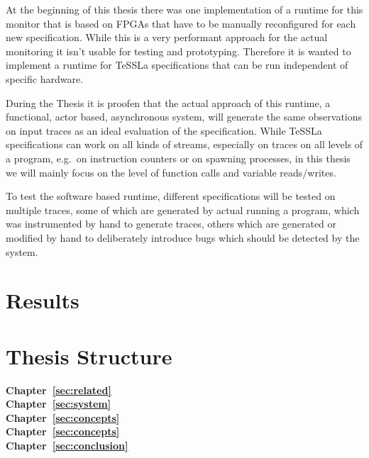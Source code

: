 At the beginning of this thesis there was one implementation of a runtime for this monitor that is based on FPGAs that have to be manually reconfigured for each new specification.
While this is a very performant approach for the actual monitoring it isn't usable for testing and prototyping.
Therefore it is wanted to implement a runtime for TeSSLa specifications that can be run independent of specific hardware.

During the Thesis it is proofen that the actual approach of this runtime, a functional, actor based, asynchronous system,
will generate the same observations on input traces as an ideal evaluation of the specification.
While TeSSLa specifications can work on all kinds of streams, especially on traces on all levels of a program, e.g.\
on instruction counters or on spawning processes, in this thesis we will mainly focus on the level of function calls and variable reads/writes.

To test the software based runtime, different specifications will be tested on multiple traces, some of which are generated by actual running a program,
which was instrumented by hand to generate traces, others which are generated or modified by hand to deliberately introduce bugs which should be detected by the system.

\section{Results}
\label{sec:intro:results}


\section{Thesis Structure}
\label{sec:intro:structure}

\textbf{Chapter~\ref{sec:related}} \\[0.2em]

\textbf{Chapter~\ref{sec:system}} \\[0.2em]

\textbf{Chapter~\ref{sec:concepts}} \\[0.2em]

\textbf{Chapter~\ref{sec:concepts}} \\[0.2em]

\textbf{Chapter~\ref{sec:conclusion}} \\[0.2em]
